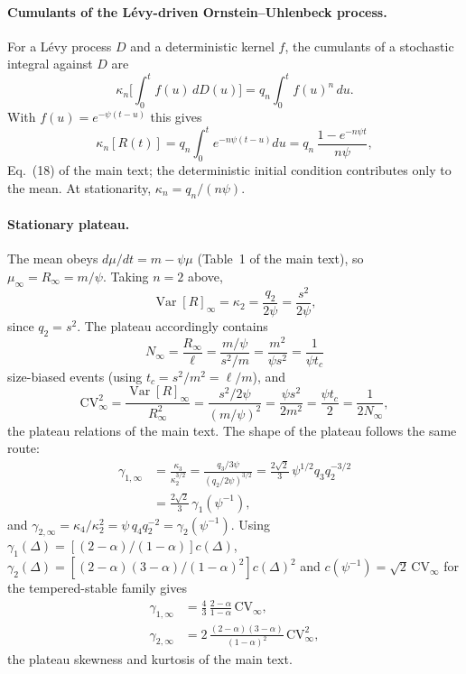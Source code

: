 \documentclass[preprint,12pt]{elsarticle}
\begin{document}
\paragraph*{Cumulants of the L\'evy-driven Ornstein--Uhlenbeck process.}
For a L\'evy process $D$ and a deterministic kernel $f$, the cumulants of a
stochastic integral against $D$ are
\begin{equation}
  \kappa_n\!\biggl[\int_0^tf(u)\,dD(u)\biggr]=q_n\int_0^tf(u)^n\,du.
\end{equation}
With $f(u)=e^{-\psi(t-u)}$ this gives
\begin{equation}
  \kappa_n[R(t)]=q_n\int_0^te^{-n\psi(t-u)}du=q_n\,\frac{1-e^{-n\psi t}}{n\psi},
\end{equation}
Eq.~(18) of the main text; the deterministic initial condition contributes
only to the mean. At stationarity, $\kappa_n=q_n/(n\psi)$.

\paragraph*{Stationary plateau.}
The mean obeys $d\mu/dt=m-\psi\mu$ (Table~1 of the main text), so
$\mu_\infty=R_\infty=m/\psi$. Taking $n=2$ above,
\begin{equation}
  \operatorname{Var}[R]_\infty=\kappa_2=\frac{q_2}{2\psi}=\frac{s^2}{2\psi},
\end{equation}
since $q_2=s^2$. The plateau accordingly contains
\begin{equation}
  N_\infty=\frac{R_\infty}{\ell}=\frac{m/\psi}{s^2/m}=\frac{m^2}{\psi s^2}=\frac1{\psi t_c}
\end{equation}
size-biased events (using $t_c=s^2/m^2=\ell/m$), and
\begin{equation*}
  \mathrm{CV}_\infty^2
  =\frac{\operatorname{Var}[R]_\infty}{R_\infty^2}
  =\frac{s^2/2\psi}{(m/\psi)^2}
  =\frac{\psi s^2}{2m^2}
  =\frac{\psi t_c}{2}
  =\frac1{2N_\infty},
\end{equation*}
the plateau relations of the main text. The shape of the plateau follows the
same route:
\begin{equation}
\begin{aligned}
  \gamma_{1,\infty}&=\frac{\kappa_3}{\kappa_2^{3/2}}
  =\frac{q_3/3\psi}{(q_2/2\psi)^{3/2}}
  =\frac{2\sqrt2}{3}\,\psi^{1/2}q_3q_2^{-3/2}\\
  &=\frac{2\sqrt2}{3}\,\gamma_1(\psi^{-1}),
\end{aligned}
\end{equation}
and $\gamma_{2,\infty}=\kappa_4/\kappa_2^2=\psi\,q_4q_2^{-2}=\gamma_2(\psi^{-1})$.
Using $\gamma_1(\Delta)=[(2-\alpha)/(1-\alpha)]c(\Delta)$,
$\gamma_2(\Delta)=[(2-\alpha)(3-\alpha)/(1-\alpha)^2]c(\Delta)^2$ and
$c(\psi^{-1})=\sqrt2\,\mathrm{CV}_\infty$ for the tempered-stable family gives
\begin{align*}
  \gamma_{1,\infty}&=\frac43\,\frac{2-\alpha}{1-\alpha}\,\mathrm{CV}_\infty,\\
  \gamma_{2,\infty}&=2\,\frac{(2-\alpha)(3-\alpha)}{(1-\alpha)^2}\,\mathrm{CV}_\infty^2,
\end{align*}
the plateau skewness and kurtosis of the main text.
\end{document}

